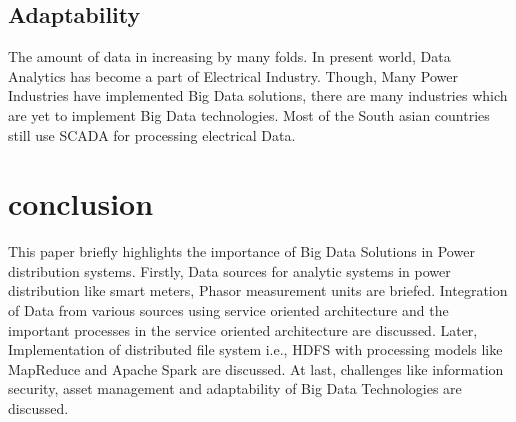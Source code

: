 \documentclass[sigconf]{acmart}
\begin{document}
\subsection{Adaptability}
The amount of data in increasing by many folds. In present world, Data Analytics has become a part of Electrical Industry. Though, Many Power Industries have implemented Big Data solutions, there are many industries which are yet to implement Big Data technologies. Most of the South asian countries still use SCADA for processing electrical Data.\cite{2002}
\section{conclusion}


This paper briefly highlights the importance of Big Data Solutions in Power distribution systems. Firstly, Data sources for analytic systems in power distribution like smart meters, Phasor measurement units are briefed. Integration of Data from various sources using service oriented architecture and the important processes in the service oriented architecture are discussed. Later, Implementation of distributed file system i.e., HDFS with processing models like MapReduce and Apache Spark are discussed. At last, challenges like information security, asset management and adaptability of Big Data Technologies are discussed. 

 
\end{document}
